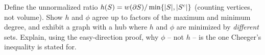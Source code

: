 \begin{exercise}
Define the unnormalized ratio $h(S)=w(\partial S)/\min\{\lvert S\rvert,\lvert S^c\rvert\}$ (counting vertices, not volume). Show $h$ and $\phi$ agree up to factors of the maximum and minimum degree, and exhibit a graph with a hub where $h$ and $\phi$ are minimized by \emph{different} sets. Explain, using the easy-direction proof, why $\phi$ -- not $h$ -- is the one Cheeger's inequality is stated for.
\end{exercise}
